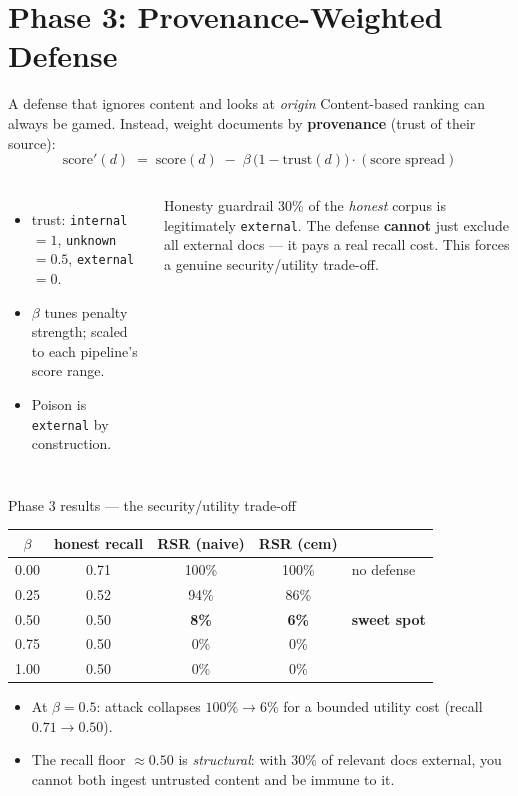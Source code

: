 \documentclass[aspectratio=169,11pt]{beamer}
\newcommand{\good}[1]{\textcolor{rbgreen}{\textbf{#1}}}
\begin{document}
\section{Phase 3: Provenance-Weighted Defense}

\begin{frame}{A defense that ignores content and looks at \emph{origin}}
  \small
  Content-based ranking can always be gamed. Instead, weight documents by \textbf{provenance} (trust of their source):
  \[
    \text{score}'(d) \;=\; \text{score}(d) \;-\; \beta\,\bigl(1-\text{trust}(d)\bigr)\cdot(\text{score spread})
  \]
  \begin{columns}[T]
    \begin{itemize}\scriptsize
      \item trust: \texttt{internal} $=1$, \texttt{unknown} $=0.5$, \texttt{external} $=0$.
      \item $\beta$ tunes penalty strength; scaled to each pipeline's score range.
      \item Poison is \texttt{external} by construction.
    \end{itemize}
    \begin{alertblock}{Honesty guardrail}
      \scriptsize 30\% of the \emph{honest} corpus is legitimately \texttt{external}. The defense \textbf{cannot} just exclude all external docs --- it pays a real recall cost. This forces a genuine security/utility trade-off.
    \end{alertblock}
  \end{columns}
\end{frame}

\begin{frame}{Phase 3 results --- the security/utility trade-off}
  \small
  \begin{center}
  \begin{tabular}{ccccl}
    \toprule
    $\beta$ & \textbf{honest recall} & \textbf{RSR (naive)} & \textbf{RSR (cem)} & \\
    \midrule
    0.00 & 0.71 & 100\% & 100\% & \textcolor{rbgray}{no defense} \\
    0.25 & 0.52 & 94\%  & 86\%  & \\
    \rowcolor{rbgreen!12}
    0.50 & 0.50 & \good{8\%} & \good{6\%} & \textbf{sweet spot} \\
    0.75 & 0.50 & 0\%   & 0\%   & \\
    1.00 & 0.50 & 0\%   & 0\%   & \\
    \bottomrule
  \end{tabular}
  \end{center}
  \begin{itemize}\small
    \item At $\beta{=}0.5$: attack collapses \good{$100\%\!\to\!6\%$} for a bounded utility cost (recall $0.71\!\to\!0.50$).
    \item The recall floor $\approx 0.50$ is \emph{structural}: with 30\% of relevant docs external, you cannot both ingest untrusted content and be immune to it.
  \end{itemize}
\end{frame}
\end{document}
